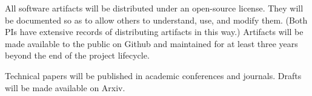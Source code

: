 All software artifacts will be distributed under an open-source
license.  They will be documented so as to allow others to understand,
use, and modify them.  (Both PIs have extensive records of
distributing artifacts in this way.)  Artifacts will be made available
to the public on Github and maintained for at least three years beyond
the end of the project lifecycle.

Technical papers will be published in academic conferences and journals.
Drafts will be made available on Arxiv.



\fi
